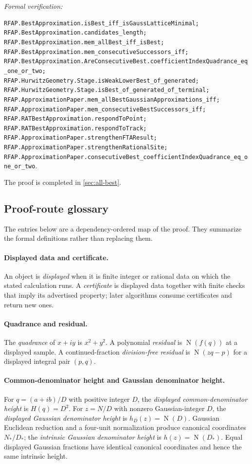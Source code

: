\documentclass[11pt]{article}
\newcommand{\Norm}[1]{\operatorname{N}\!\left(#1\right)}
\newcommand{\leanref}[1]{\par\smallskip\noindent
  \emph{Formal verification:}\par\nobreak
  {\raggedright\nolinkurl{#1}.\par}}
\begin{document}
\leanref{RFAP.BestApproximation.isBest_iff_isGaussLatticeMinimal;
RFAP.BestApproximation.candidates_length;
RFAP.BestApproximation.mem_allBest_iff_isBest;
RFAP.BestApproximation.mem_consecutiveSuccessors_iff;
RFAP.BestApproximation.AreConsecutiveBest.coefficientIndexQuadrance_eq_one_or_two;
RFAP.HurwitzGeometry.Stage.isWeakLowerBest_of_generated;
RFAP.HurwitzGeometry.Stage.isBest_of_generated_of_terminal;
RFAP.ApproximationPaper.mem_allBestGaussianApproximations_iff;
RFAP.ApproximationPaper.mem_consecutiveBestSuccessors_iff;
RFAP.RATBestApproximation.respondToPoint;
RFAP.RATBestApproximation.respondToTrack;
RFAP.ApproximationPaper.strengthenFTAResult;
RFAP.ApproximationPaper.strengthenRationalSite;
RFAP.ApproximationPaper.consecutiveBest_coefficientIndexQuadrance_eq_one_or_two}

The proof is completed in \cref{sec:all-best}.

\subsection{Proof-route glossary}
\label{sec:proof-route-glossary}

The entries below are a dependency-ordered map of the proof.  They summarize
the formal definitions rather than replacing them.

\paragraph{Displayed data and certificate.}
An object is \emph{displayed} when it is finite integer or rational data on
which the stated calculation runs.  A \emph{certificate} is displayed data
together with finite checks that imply its advertised property; later
algorithms consume certificates and return new ones.

\paragraph{Quadrance and residual.}
The \emph{quadrance} of $x+iy$ is $x^2+y^2$.  A polynomial \emph{residual}
is $\Norm{f(q)}$ at a displayed sample.  A continued-fraction
\emph{division-free residual} is $\Norm{zq-p}$ for a displayed integral pair
$(p,q)$.

\paragraph{Common-denominator height and Gaussian denominator height.}
For $q=(a+ib)/D$ with positive integer $D$, the
\emph{displayed common-denominator height} is $H(q)=D^2$.  For
$z=N/D$ with nonzero Gaussian-integer $D$, the \emph{displayed Gaussian
denominator height} is $h_D(z)=\Norm D$.  Gaussian Euclidean reduction and
a four-unit normalization produce canonical coordinates $N_*/D_*$; the
\emph{intrinsic Gaussian denominator height} is $h(z)=\Norm{D_*}$.
Equal displayed Gaussian fractions have identical canonical coordinates and
hence the same intrinsic height.
\end{document}
